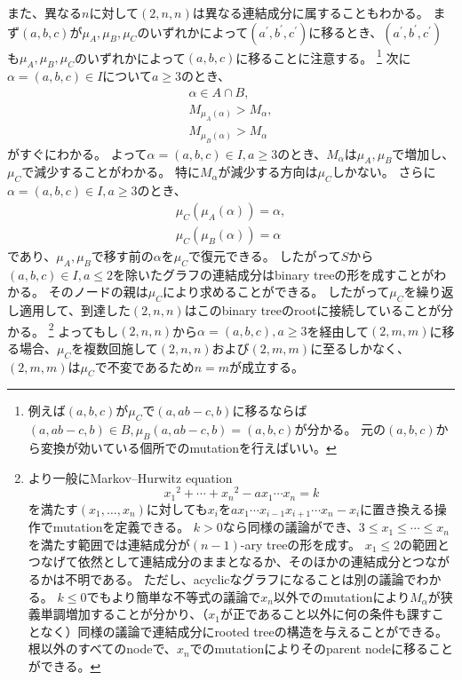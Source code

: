 \documentclass[uplatex,12pt,dvipdfmx]{jsarticle}
\theoremstyle{definition}
\numberwithin{equation}{section}
\begin{document}
また、異なる$n$に対して$(2,n,n)$は異なる連結成分に属することもわかる。
まず$(a, b, c)$が$\mu_A, \mu_B, \mu_C$のいずれかによって$(a^\prime, b^\prime, c^\prime)$に移るとき、$(a^\prime, b^\prime, c^\prime)$も$\mu_A, \mu_B, \mu_C$のいずれかによって$(a, b, c)$に移ることに注意する。
\footnote{
	例えば$(a,b,c)$が$\mu_C$で$(a,ab-c,b)$に移るならば$(a,ab-c,b)\in B, \mu_B(a,ab-c,b)=(a,b,c)$が分かる。
	元の$(a,b,c)$から変換が効いている個所でのmutationを行えばいい。
}
次に$\alpha=(a,b,c)\in I$について$a\ge 3$のとき、
\begin{gather}
	\alpha\in A\cap B, \\
	M_{\mu_A(\alpha)} > M_\alpha, \\
	M_{\mu_B(\alpha)} > M_\alpha
\end{gather}
がすぐにわかる。
よって$\alpha=(a,b,c)\in I, a\ge3$のとき、$M_\alpha$は$\mu_A, \mu_B$で増加し、$\mu_C$で減少することがわかる。
特に$M_\alpha$が減少する方向は$\mu_C$しかない。
さらに$\alpha=(a,b,c)\in I, a\ge3$のとき、
\begin{gather}
	\mu_C(\mu_A(\alpha)) = \alpha, \\
	\mu_C(\mu_B(\alpha)) = \alpha
\end{gather}
であり、$\mu_A,\mu_B$で移す前の$\alpha$を$\mu_C$で復元できる。
したがって$S$から$(a,b,c)\in I, a\le2$を除いたグラフの連結成分はbinary treeの形を成すことがわかる。
そのノードの親は$\mu_C$により求めることができる。
したがって$\mu_C$を繰り返し適用して、到達した$(2,n,n)$はこのbinary treeのrootに接続していることが分かる。
\footnote{
	より一般にMarkov--Hurwitz equation
	\begin{equation}
		x_1{}^2+\cdots+x_n{}^2-ax_1\cdots x_n=k
	\end{equation}
	を満たす$(x_1,\ldots,x_n)$に対しても$x_i$を$ax_1\cdots x_{i-1}x_{i+1}\cdots x_n-x_i$に置き換える操作でmutationを定義できる。
	$k>0$なら同様の議論ができ、$3\le x_1\le\cdots\le x_n$を満たす範囲では連結成分が$(n-1)$-ary treeの形を成す。
	$x_1\le 2$の範囲とつなげて依然として連結成分のままとなるか、そのほかの連結成分とつながるかは不明である。
	ただし、acyclicなグラフになることは別の議論でわかる。
	$k\le 0$でもより簡単な不等式の議論で$x_n$以外でのmutationにより$M_\alpha$が狭義単調増加することが分かり、（$x_1$が正であること以外に何の条件も課すことなく）同様の議論で連結成分にrooted treeの構造を与えることができる。
	根以外のすべてのnodeで、$x_n$でのmutationによりそのparent nodeに移ることができる。
}
よってもし$(2,n,n)$から$\alpha=(a,b,c),a\ge 3$を経由して$(2,m,m)$に移る場合、$\mu_C$を複数回施して$(2,n,n)$および$(2,m,m)$に至るしかなく、$(2,m,m)$は$\mu_C$で不変であるため$n=m$が成立する。
\end{document}
